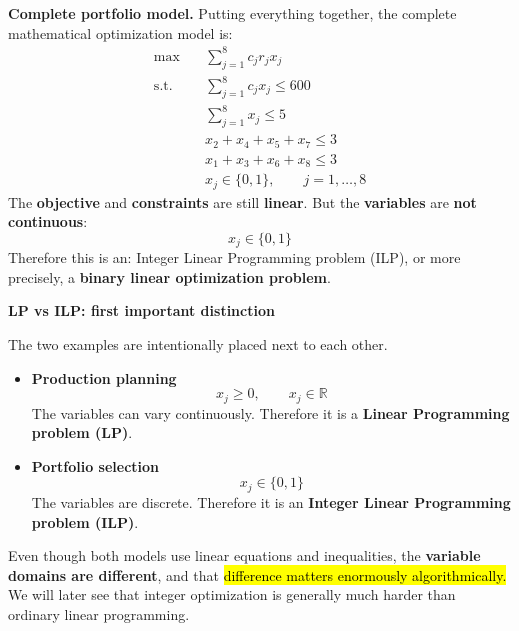 \begin{examplebox}
    \highspace
    \textcolor{Green3}{ \textbf{Complete portfolio model.}} Putting everything together, the complete mathematical optimization model is:
    \begin{equation*}
        \boxed{
            \begin{aligned}
                \max\quad
                &\sum_{j=1}^{8}c_jr_jx_j\\[1mm]
                \text{s.t.}\quad
                &\sum_{j=1}^{8}c_jx_j\leq600\\
                &\sum_{j=1}^{8}x_j\leq5\\
                &x_2+x_4+x_5+x_7\leq3\\
                &x_1+x_3+x_6+x_8\leq3\\
                &x_j\in\{0,1\},
                \qquad j=1,\ldots,8
            \end{aligned}
        }
    \end{equation*}
    The \textbf{objective} and \textbf{constraints} are still \textbf{linear}. But the \textbf{variables} are \textbf{not continuous}:
    \begin{equation*}
        x_j\in\{0,1\}
    \end{equation*}
    Therefore this is an: Integer Linear Programming problem (ILP), or more precisely, a \textbf{binary linear optimization problem}.
\end{examplebox}

\begin{flushleft}
    \textcolor{Green3}{ \textbf{LP vs ILP: first important distinction}}
\end{flushleft}
The two examples are intentionally placed next to each other.
\begin{itemize}
    \item \textbf{Production planning}
        \begin{equation*}
            x_j\geq0,\qquad x_j\in\mathbb R
        \end{equation*}
        The variables can vary continuously. Therefore it is a \textbf{Linear Programming problem (LP)}.

    \item \textbf{Portfolio selection}
        \begin{equation*}
            x_j\in\{0,1\}
        \end{equation*}
        The variables are discrete. Therefore it is an \textbf{Integer Linear Programming problem (ILP)}.
\end{itemize}
Even though both models use linear equations and inequalities, the \textbf{variable domains are different}, and that \hl{difference matters enormously algorithmically.} We will later see that integer optimization is generally much harder than ordinary linear programming.

